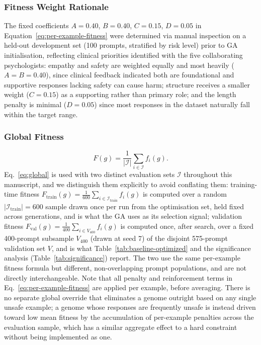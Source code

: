\documentclass[mathematics,article,submit,xetex,moreauthors]{Definitions/mdpi}
\begin{document}
\subsubsection{Fitness Weight Rationale}
\label{sec:fitness-rationale}

The fixed coefficients $A=0.40$, $B=0.40$, $C=0.15$, $D=0.05$ in Equation~\eqref{eq:per-example-fitness}
were determined via manual inspection on a held-out development set (100 prompts, stratified by
risk level) prior to GA initialisation, reflecting clinical priorities identified with the five
collaborating psychologists: empathy and safety are weighted equally and most heavily ($A=B=0.40$), since clinical
feedback indicated both are foundational and supportive responses lacking safety can cause harm;
structure receives a smaller weight ($C=0.15$) as a supporting rather than primary
role; and the length penalty is minimal ($D=0.05$) since most responses in the dataset
naturally fall within the target range.

\subsubsection{Global Fitness}
\begin{equation}
\label{eq:global}
  F(g) = \frac{1}{|\mathcal{I}|} \sum_{i \in \mathcal{I}} f_i(g).
\end{equation}
Eq.~\eqref{eq:global} is used with two distinct evaluation sets
$\mathcal{I}$ throughout this manuscript, and we distinguish them
explicitly to avoid conflating them: training-time fitness
$F_{\mathrm{train}}(g) = \frac{1}{600}\sum_{i \in \mathcal{I}_{\mathrm{train}}} f_i(g)$
is computed over a random $|\mathcal{I}_{\mathrm{train}}|=600$
sample drawn once per run from the optimisation set, held fixed across generations, and is what the GA uses as its selection signal; validation fitness
$F_{\mathrm{val}}(g) = \frac{1}{400}\sum_{i \in V_{400}} f_i(g)$ is
computed once, after search, over a fixed 400-prompt subsample $V_{400}$
(drawn at seed 7) of the disjoint 575-prompt validation set $V$,
and is what Table~\ref{tab:baseline-optimized} and
the significance analysis (Table~\ref{tab:significance}) report. The two
use the same per-example fitness formula but different, non-overlapping
prompt populations, and are not directly interchangeable. Note that all penalty and reinforcement terms in Eq.~\eqref{eq:per-example-fitness}
are applied per example, before averaging. There is no separate global
override that eliminates a genome outright based on any single unsafe
example; a genome whose responses are frequently unsafe is instead driven
toward low mean fitness by the accumulation of per-example penalties across
the evaluation sample, which has a similar aggregate effect to a hard
constraint without being implemented as one.
\end{document}

